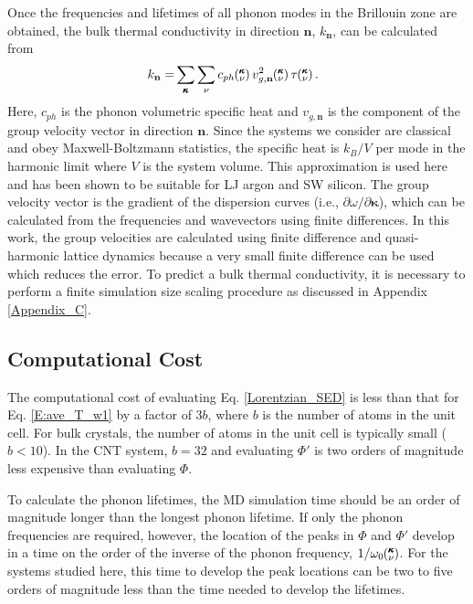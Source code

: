 \documentclass[letterpaper,12pt]{article}
\newcommand{\kv}{\mspace{-4.0mu}\left(\mspace{-8.0mu}\begin{smallmatrix}&\pmb{\kappa} \\&\nu\end{smallmatrix}\mspace{-3.0mu}\right)}
\begin{document}
Once the frequencies and lifetimes of all phonon modes in the
Brillouin zone are obtained, the bulk thermal conductivity in direction
$\mathbf{n}$, $k_{\mathbf{n}}$, can be calculated from \cite{ziman2001}
\begin{equation}\label{E-size:k_bulk}\
\begin{split}
k_{\mathbf{n}}=&\sum_{\pmb{\kappa}} \sum_\nu c_{ph} \kv v^{2}_{g,\mathbf{n}} \kv \tau \kv.
\end{split}
\end{equation}
Here, $c_{ph}$ is the phonon volumetric specific heat and ${v}_{g,\mathbf{n}}$ is
the component of the group velocity vector in direction $\mathbf{n}$. Since the systems we consider are classical and obey Maxwell-Boltzmann statistics,\cite{mcquarrie2000} the
specific heat is $k_{B}/V$ per mode in the harmonic limit where $V$ is the system volume. This approximation is used here and has been shown to be suitable for LJ argon\cite{mcgaughey2004c} and SW silicon.\cite{goicochea2010} The group
velocity vector is the gradient of the dispersion curves (i.e., $\partial \omega / \partial \pmb{\kappa}$), which can be calculated from the frequencies and wavevectors using finite differences. In this work, the group velocities are calculated using finite difference and quasi-harmonic lattice dynamics because a very small finite difference can be used which reduces the error.\cite{mcgaughey2006b} To predict a bulk thermal conductivity, it is necessary to perform a finite simulation size scaling procedure as discussed in Appendix \ref{Appendix_C}.

\subsection{\label{Subsection_Comp_Details_3}Computational Cost}

The computational cost of evaluating Eq. \eqref{Lorentzian_SED} is less than that for Eq$.$ \eqref{E:ave_T_w1} by a factor of $3b$, where $b$ is the number of atoms in the unit cell.  For bulk crystals, the number of atoms in the unit cell is typically small ($b<10$).  In the CNT system, $b=32$ and evaluating $\Phi'$ is two orders of magnitude less expensive than evaluating $\Phi$.

To calculate the phonon lifetimes, the MD simulation time should be an order of magnitude longer than the longest phonon lifetime.\cite{thomasthesis}  If only the phonon frequencies are required, however, the location of the peaks in $\Phi$ and $\Phi'$ develop in a time on the order of the inverse of the phonon frequency, $1/\omega_0\kv$. For the systems studied here, this time to develop the peak locations can be two to five orders of magnitude less than the time needed to develop the lifetimes.
\end{document}
